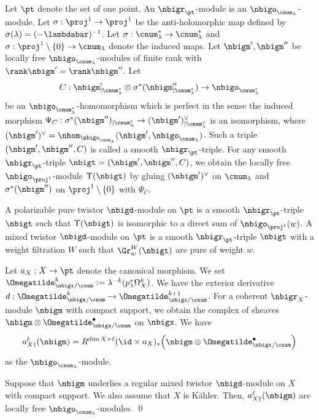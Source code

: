 \documentclass[a4,10pt]{article}
\begin{document}
Let $\pt$ denote the set of one point.
An $\nbigr_{\pt}$-module is an $\nbigo_{\cnum_{\lambda}}$-module.
Let $\sigma:\proj^1\to\proj^1$ be
the anti-holomorphic map defined by
$\sigma(\lambda)=(-\lambdabar)^{-1}$.
Let $\sigma:\cnum_{\lambda}^{\ast}\to\cnum_{\lambda}^{\ast}$
and $\sigma:\proj^1\setminus\{0\}\to\cnum_{\lambda}$
denote the induced maps.
Let $\nbigm',\nbigm''$ be locally free
$\nbigo_{\cnum_{\lambda}}$-modules of finite rank
with $\rank\nbigm'=\rank\nbigm''$.
Let 
\[
C:\nbigm'_{|\cnum_{\lambda}^{\ast}}
\otimes
 \sigma^{\ast}(\nbigm''_{|\cnum_{\lambda}^{\ast}})
 \to
 \nbigo_{\cnum_{\lambda}^{\ast}}
\]
be an $\nbigo_{\cnum_{\lambda}^{\ast}}$-homomorphism
which is perfect in the sense
the induced morphism
$\Psi_C:\sigma^{\ast}(\nbigm'')_{|\cnum_{\lambda}^{\ast}}
\to
(\nbigm')^{\lor}_{|\cnum_{\lambda}^{\ast}}$
is an isomorphism,
where
$(\nbigm')^{\lor}
=\nhom_{\nbigo_{\cnum_{\lambda}}}(\nbigm',\nbigo_{\cnum_{\lambda}})$.
Such a triple $(\nbigm',\nbigm'',C)$
is called a smooth $\nbigr_{\pt}$-triple.
For any smooth $\nbigr_{\pt}$-triple
$\nbigt=(\nbigm',\nbigm'',C)$,
we obtain
the locally free $\nbigo_{\proj^1}$-module
$\Upsilon(\nbigt)$
by gluing
$(\nbigm')^{\lor}$ on $\cnum_{\lambda}$
and 
$\sigma^{\ast}(\nbigm'')$ on $\proj^1\setminus\{0\}$
with $\Psi_C$.

A polarizable pure twistor $\nbigd$-module on $\pt$
is a smooth $\nbigr_{\pt}$-triple $\nbigt$
such that
$\Upsilon(\nbigt)$
is isomorphic to a direct sum of $\nbigo_{\proj^1}(w)$.
A mixed twistor $\nbigd$-module on $\pt$
is a smooth $\nbigr_{\pt}$-triple $\nbigt$
with a weight filtration $W$
such that
$\Gr^W_w(\nbigt)$
are pure of weight $w$.

Let $a_X:X\to\pt$ denote the canonical morphism.
We set
$\Omegatilde^k_{\nbigx/\cnum}:=
\lambda^{-k}(p_{\lambda}^{\ast}\Omega_X^k)$.
We have the exterior derivative
$d:\Omegatilde^k_{\nbigx/\cnum}\to\Omegatilde^{k+1}_{\nbigx/\cnum}$.
For a coherent $\nbigr_X$-module $\nbigm$ with compact support,
we obtain the complex of sheaves
$\nbigm\otimes \Omegatilde^{\bullet}_{\nbigx/\cnum}$
on $\nbigx$.
We have
\[
 a_{X\dagger}^{\ell}(\nbigm)=
 R^{\dim X+\ell}(\id\times a_X)_{\ast}\Bigl(
 \nbigm\otimes\Omegatilde^{\bullet}_{\nbigx/\cnum}
 \Bigr)
\]
as the $\nbigo_{\cnum_{\lambda}}$-module.

\begin{cor}
\label{cor;25.6.29.1}
Suppose that $\nbigm$ underlies
a regular mixed twistor $\nbigd$-module on $X$
with compact support. 
We also assume that $X$ is K\"ahler.
Then,
$a_{X\dagger}^{\ell}(\nbigm)$
are locally free $\nbigo_{\cnum_{\lambda}}$-modules.
\hfill\qed
\end{cor}
\end{document}
